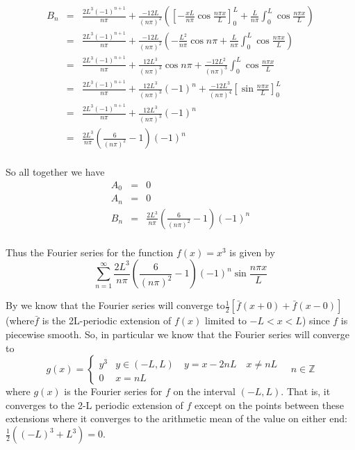\documentclass[12pt]{article}
\begin{document}
\begin{eqnarray*}B_n &=&  \frac{2 L^3 (-1)^{n+1} }{n \pi}    + \frac{-12 L}{(n \pi)^2}  \left( \left[ - \frac{x L}{n \pi } \cos{\frac{n \pi x}{L}}   \right]_0^L + \frac{L}{n \pi } \int_0^L  \cos{\frac{n \pi x}{L}} \right)  \\
 &=&  \frac{2 L^3 (-1)^{n+1} }{n \pi}    + \frac{-12 L}{(n \pi)^2}  \left(  - \frac{ L^2 }{n \pi } \cos{n \pi }   + \frac{L}{n \pi } \int_0^L  \cos{\frac{n \pi x}{L}} \right)  \\
  &=&  \frac{2 L^3 (-1)^{n+1} }{n \pi}    +   \frac{12 L^3}{(n \pi)^3}   \cos{n \pi }   +  \frac{-12 L^2}{(n \pi)^3}  \int_0^L  \cos{\frac{n \pi x}{L}}   \\
  &=&  \frac{2 L^3 (-1)^{n+1} }{n \pi}    +   \frac{12 L^3}{(n \pi)^3}   (-1)^n   +  \frac{-12 L^3}{(n \pi)^4}  \left[ \sin{\frac{n \pi x}{L}}  \right]_0^L \\
  &=&  \frac{2 L^3 (-1)^{n+1} }{n \pi}    +   \frac{12 L^3}{(n \pi)^3}   (-1)^n  \\
    &=& \frac{ 2 L^3}{n \pi}\left(    \frac{6}{(n \pi)^2}  -1 \right)  (-1)^n  \\
\end{eqnarray*}

So all together we have 
\begin{eqnarray*}A_0 &=& 0 \\
A_n &=& 0 \\
B_n  &=& \frac{ 2 L^3}{n \pi}\left(    \frac{6}{(n \pi)^2}  -1 \right)  (-1)^n  \\
\end{eqnarray*}

Thus the Fourier series for the function $f(x)=x^3$ is given by
\[ \sum_{n=1}^\infty \frac{ 2 L^3}{n \pi}\left(    \frac{6}{(n \pi)^2}  -1 \right)  (-1)^n  \sin{\frac{n \pi x}{L}} \]

By \cite[Theorem 1.1 Page 49]{pinsky} we know that the Fourier series will converge to$ \frac{1}{2}\left[ \bar{f} (x+0) + \bar{f} (x-0) \right]$ (where$\bar{f}$ is the 2L-periodic extension of $f(x)$ limited to $-L < x< L$) since $f$ is piecewise smooth. So, in particular we know that the Fourier series will converge to 
\[g(x)= \left\{
\begin{array}{lr}
y^3 & y \in (-L,L) \quad y = x-2nL \quad x \neq n L\\
0 & x=n L
\end{array} \right.  \quad n\in \mathbb{Z}\]
where $g(x)$ is the Fourier series for $f$ on the interval $(-L,L)$. That is, it converges to the 2-L periodic extension of $f$ except on the points between these extensions where it converges to the arithmetic mean of the value on either end: $\frac{1}{2}((-L)^3+L^3)=0$.
\end{document}
